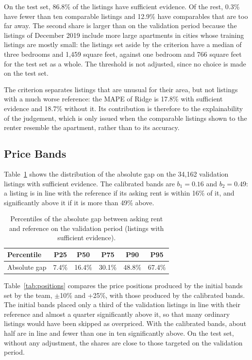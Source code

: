 \documentclass[12pt,a4paper]{report}
\begin{document}
On the test set, 86.8\% of the listings have sufficient evidence. Of the
rest, 0.3\% have fewer than ten comparable listings and 12.9\% have
comparables that are too far away. The second share is larger than on the
validation period because the listings of December 2019 include more large
apartments in cities whose training listings are mostly small: the listings
set aside by the criterion have a median of three bedrooms and 1,459 square
feet, against one bedroom and 766 square feet for the test set as a whole.
The threshold is not adjusted, since no choice is made on the test set.

The criterion separates listings that are unusual for their area, but not
listings with a much worse reference: the MAPE of Ridge is 17.8\% with
sufficient evidence and 18.7\% without it. Its contribution is therefore to
the explainability of the judgement, which is only issued when the comparable
listings shown to the renter resemble the apartment, rather than to its
accuracy.

\subsection{Price Bands}
\label{sec:results-bands}

Table~\ref{tab:gap-percentiles} shows the distribution of the absolute gap
on the 34,162 validation listings with sufficient evidence. The calibrated
bands are $b_1 = 0.16$ and $b_2 = 0.49$: a listing is in line with the
reference if its asking rent is within 16\% of it, and significantly above
it if it is more than 49\% above.

\begin{table}[H]
\centering
\caption{Percentiles of the absolute gap between asking rent and reference
on the validation period (listings with sufficient evidence).}
\label{tab:gap-percentiles}
\begin{tabular}{lccccc}
\toprule
\textbf{Percentile} & P25 & P50 & P75 & P90 & P95\\
\midrule
Absolute gap & 7.4\% & 16.4\% & 30.1\% & 48.8\% & 67.4\%\\
\bottomrule
\end{tabular}
\end{table}

Table~\ref{tab:positions} compares the price positions produced by the
initial bands set by the team, $\pm$10\% and +25\%, with those produced by
the calibrated bands. The initial bands placed only a third of the
validation listings in line with their reference and almost a quarter
significantly above it, so that many ordinary listings would have been
skipped as overpriced. With the calibrated bands, about half are in line
and fewer than one in ten significantly above. On the test set, without
any adjustment, the shares are close to those targeted on the validation
period.
\end{document}
